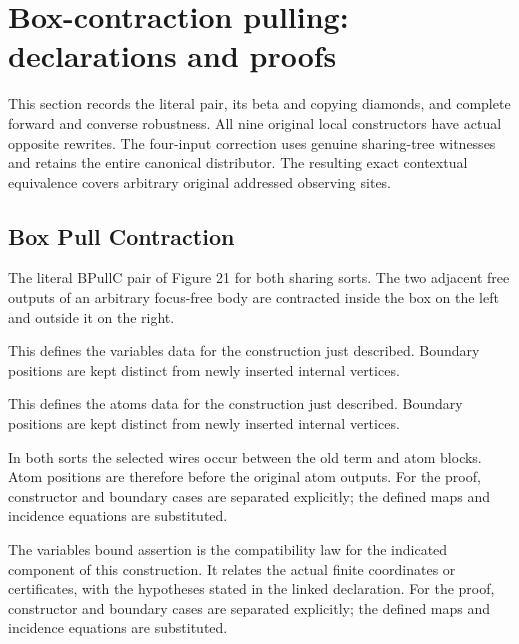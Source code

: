 \clearpage
\section{Box-contraction pulling: declarations and proofs}
\label{sec:bpullc-concordance}
This section records the literal pair, its beta and copying diamonds, and complete forward and converse robustness. All nine original local constructors have actual opposite rewrites. The four-input correction uses genuine sharing-tree witnesses and retains the entire canonical distributor. The resulting exact contextual equivalence covers arbitrary original addressed observing sites.

\subsection{Box Pull Contraction}
The literal BPullC pair of Figure 21 for both sharing sorts. The two adjacent free outputs of an arbitrary focus-free body are contracted inside the box on the left and outside it on the right.

This defines the variables data for the construction just described. Boundary positions are kept distinct from newly inserted internal vertices.
\par{}

This defines the atoms data for the construction just described. Boundary positions are kept distinct from newly inserted internal vertices.
\par{}

In both sorts the selected wires occur between the old term and atom blocks. Atom positions are therefore before the original atom outputs.
For the proof, constructor and boundary cases are separated explicitly; the defined maps and incidence equations are substituted.
\par{}

The variables bound assertion is the compatibility law for the indicated component of this construction. It relates the actual finite coordinates or certificates, with the hypotheses stated in the linked declaration.
For the proof, constructor and boundary cases are separated explicitly; the defined maps and incidence equations are substituted.
\par{}

